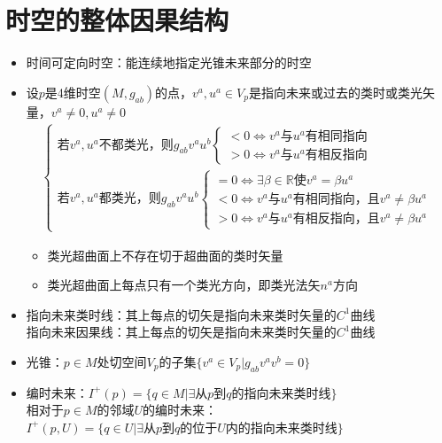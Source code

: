 \chapter{时空的整体因果结构}

\begin{itemize}
    \item 时间可定向时空：能连续地指定光锥未来部分的时空
    \item 设$p$是4维时空$(M, g_{ab})$的点，$v^a, u^a \in V_{p}$是指向未来或过去的类时或类光矢量，$v^a \neq 0, u^a \neq 0$
    \begin{gather*}
        \begin{cases}
            \text{若}v^a, u^a \text{不都类光，则}g_{ab} v^a u^b 
            \begin{cases}
                < 0 \iff v^a \text{与}u^a \text{有相同指向}\\
                > 0 \iff v^a \text{与}u^a \text{有相反指向}
            \end{cases}
            \\
            \text{若}v^a, u^a \text{都类光，则}g_{ab} v^a u^b
            \begin{cases}
                = 0 \iff \exists \beta \in \mathbb{R} \text{使} v^a = \beta u^a\\
                < 0 \iff v^a \text{与}u^a \text{有相同指向，且}v^a \neq \beta u^a\\
                > 0 \iff v^a \text{与}u^a \text{有相反指向，且}v^a \neq \beta u^a
            \end{cases}
        \end{cases}
    \end{gather*}
    \begin{itemize}
        \item 类光超曲面上不存在切于超曲面的类时矢量
        \item 类光超曲面上每点只有一个类光方向，即类光法矢$n^a$方向
    \end{itemize}
    \item 指向未来类时线：其上每点的切矢是指向未来类时矢量的$C^1$曲线\\
    指向未来因果线：其上每点的切矢是指向未来类时矢量的$C^1$曲线
    \item 光锥：$p\in M$处切空间$V_p$的子集$\{v^a \in V_p | g_{ab} v^a v^b = 0\}$
    \item 编时未来：$I^+(p)=\{q\in M | \exists \text{从} p \text{到} q \text{的指向未来类时线}\}$\\
    相对于$p \in M$的邻域$U$的编时未来：$I^+(p, U)=\{q \in U | \exists \text{从} p \text{到} q \text{的位于$U$内的指向未来类时线}\}$

\end{itemize}
